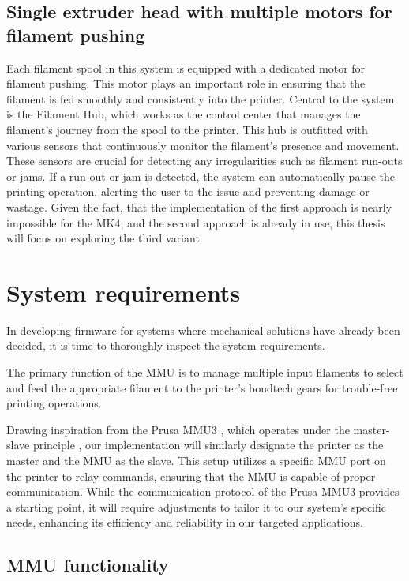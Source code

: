 \subsection{Single extruder head with multiple motors for filament pushing}

Each filament spool in this system is equipped with a dedicated motor for filament pushing. This motor plays an important role in ensuring that the filament is fed smoothly and consistently into the printer. Central to the system is the Filament Hub, which works as the control center that manages the filament's journey from the spool to the printer. This hub is outfitted with various sensors that continuously monitor the filament's presence and movement. These sensors are crucial for detecting any irregularities such as filament run-outs or jams. If a run-out or jam is detected, the system can automatically pause the printing operation, alerting the user to the issue and preventing damage or wastage. Given the fact, that the implementation of the first approach is nearly impossible for the MK4, and the second approach is already in use, this thesis will focus on exploring the third variant.

\section{System requirements}

In developing firmware for systems where mechanical solutions have already been decided, it is time to thoroughly inspect the system requirements. 

The primary function of the MMU is to manage multiple input filaments to select and feed the appropriate filament to the printer’s bondtech gears for trouble-free printing operations.

Drawing inspiration from the Prusa MMU3 \cite{prusa-mmu3}, which operates under the master-slave principle \cite{master-slave}, our implementation will similarly designate the printer as the master and the MMU as the slave. This setup utilizes a specific MMU port on the printer to relay commands, ensuring that the MMU is capable of proper communication. While the communication protocol of the Prusa MMU3 provides a starting point, it will require adjustments to tailor it to our system's specific needs, enhancing its efficiency and reliability in our targeted applications.

\subsection{MMU functionality}

